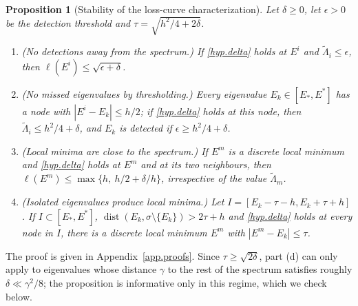 \documentclass[10pt]{amsart}
\newenvironment{revblock}{\color{blue}}{}
\theoremstyle{definition}
\theoremstyle{remark}
\theoremstyle{plain}
\newtheorem{proposition}[theorem]{Proposition}
\DeclareMathOperator{\dist}{dist}
\begin{document}
\begin{revblock}
\begin{proposition}[Stability of the loss-curve characterization]\label{prop.stability}
Let $\delta\ge0$, let $\epsilon>0$ be the detection threshold and
$\tau=\sqrt{h^2/4+2\delta}$.
\begin{enumerate}
\item[(a)] (No detections away from the spectrum.) If \eqref{hyp.delta} holds at $E^i$ and
$\tilde\Lambda_i\le\epsilon$, then $\ell(E^i)\le\sqrt{\epsilon+\delta}$.
\item[(b)] (No missed eigenvalues by thresholding.) Every eigenvalue $E_k\in[E_*,E^*]$ has a node
with $|E^i-E_k|\le h/2$; if \eqref{hyp.delta} holds at this node, then $\tilde\Lambda_i\le h^2/4+\delta$,
and $E_k$ is detected if $\epsilon\ge h^2/4+\delta$.
\item[(c)] (Local minima are close to the spectrum.) If $E^m$ is a discrete local minimum and
\eqref{hyp.delta} holds at $E^m$ and at its two neighbours, then $\ell(E^m)\le\max\{h,\ h/2+\delta/h\}$,
irrespective of the value $\tilde\Lambda_m$.
\item[(d)] (Isolated eigenvalues produce local minima.) Let $I=[E_k-\tau-h,E_k+\tau+h]$. If
$I\subset[E_*,E^*]$, $\dist(E_k,\sigma\setminus\{E_k\})>2\tau+h$ and \eqref{hyp.delta} holds at every node
in $I$, there is a discrete local minimum $E^m$ with $|E^m-E_k|\le\tau$.
\end{enumerate}
\end{proposition}
The proof is given in Appendix~\ref{app.proofs}. Since $\tau\ge\sqrt{2\delta}$, part (d) can only
apply to eigenvalues whose distance $\gamma$ to the rest of the spectrum satisfies roughly
$\delta\ll\gamma^2/8$; the proposition is informative only in this regime, which we check below.


\end{revblock}
\end{document}
